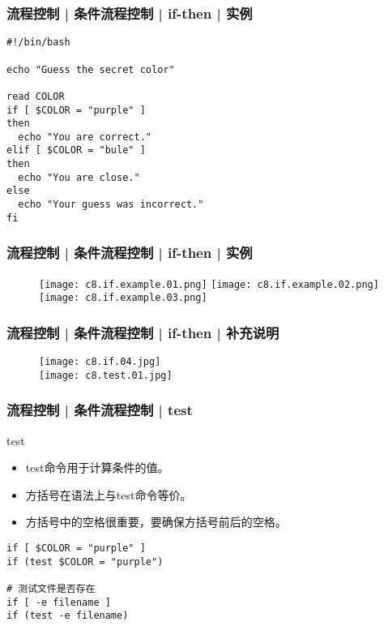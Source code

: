 \begin{frame}[fragile]
  \frametitle{流程控制 | 条件流程控制 | if-then | 实例}
\begin{lstlisting}
#!/bin/bash

echo "Guess the secret color"

read COLOR
if [ $COLOR = "purple" ]
then
  echo "You are correct."
elif [ $COLOR = "bule" ]
then
  echo "You are close."
else
  echo "Your guess was incorrect."
fi
\end{lstlisting}
\end{frame}

\begin{frame}
  \frametitle{流程控制 | 条件流程控制 | if-then | \alert{实例}}
  \begin{figure}
    \texttt{[image: c8.if.example.01.png]}\quad
    \texttt{[image: c8.if.example.02.png]}\\
    \texttt{[image: c8.if.example.03.png]}
  \end{figure}
\end{frame}

\begin{frame}
  \frametitle{流程控制 | 条件流程控制 | if-then | 补充说明}
  \begin{figure}
    \centering
    \texttt{[image: c8.if.04.jpg]}\\
    \texttt{[image: c8.test.01.jpg]}
  \end{figure}
\end{frame}

\begin{frame}[fragile]
  \frametitle{流程控制 | 条件流程控制 | \alert{test}}
  \begin{block}{test}
    \begin{itemize}
      \item test命令用于计算条件的值。
      \item 方括号在语法上与test命令等价。
      \item 方括号中的空格很重要，要确保方括号前后的空格。
    \end{itemize}
  \end{block}
  \pause
\begin{lstlisting}
if [ $COLOR = "purple" ]
if (test $COLOR = "purple")

# 测试文件是否存在
if [ -e filename ]
if (test -e filename)
\end{lstlisting}
\end{frame}

